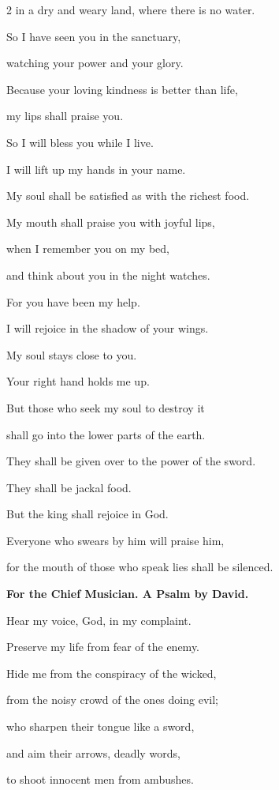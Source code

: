 \begin{multicols}{2}
	in a dry and weary land, where there is no water.
	
	
	\myverse{}So I have seen you in the sanctuary,
	
	watching your power and your glory.
	
	
	\myverse{}Because your loving kindness is better than life,
	
	my lips shall praise you.
	
	
	\myverse{}So I will bless you while I live.
	
	I will lift up my hands in your name.
	
	
	\myverse{}My soul shall be satisfied as with the richest food.
	
	My mouth shall praise you with joyful lips,
	
	
	\myverse{}when I remember you on my bed,
	
	and think about you in the night watches.
	
	
	\myverse{}For you have been my help.
	
	I will rejoice in the shadow of your wings.
	
	
	\myverse{}My soul stays close to you.
	
	Your right hand holds me up.
	
	
	\myverse{}But those who seek my soul to destroy it
	
	shall go into the lower parts of the earth.
	
	
	\myverse{}They shall be given over to the power of the sword.
	
	They shall be jackal food.
	
	
	\myverse{}But the king shall rejoice in God.
	
	Everyone who swears by him will praise him,
	
	for the mouth of those who speak lies shall be silenced.
	
	
	\mychapter{}\textbf{For the Chief Musician. A Psalm by David.}
	
	\quad \myverse*{}Hear my voice, God, in my complaint.
	
	Preserve my life from fear of the enemy.
	
	
	\myverse{}Hide me from the conspiracy of the wicked,
	
	from the noisy crowd of the ones doing evil;
	
	
	\myverse{}who sharpen their tongue like a sword,
	
	and aim their arrows, deadly words,
	
	
	\myverse{}to shoot innocent men from ambushes.
	

\end{multicols}
